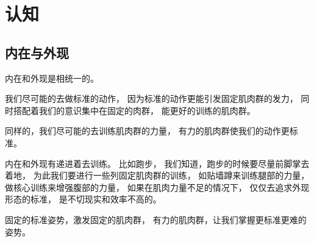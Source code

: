 
\chapter{认知}

\section{内在与外现}

内在和外现是相统一的。

我们尽可能的去做标准的动作，
因为标准的动作更能引发固定肌肉群的发力，
同时搭配着我们的意识集中在固定的肉群，
能更好的训练的肌肉群。

同样的，我们尽可能的去训练肌肉群的力量，
有力的肌肉群使我们的动作更标准。

内在和外现有递进着去训练。
比如跑步，
我们知道，跑步的时候要尽量前脚掌去着地，
为此我们要进行一些列固定肌肉群的训练，
如贴墙蹲来训练腿部的力量，
做核心训练来增强腹部的力量，
如果在肌肉力量不足的情况下，
仅仅去追求外现形态的标准，
是不切现实和效率不高的。

固定的标准姿势，激发固定的肌肉群，
有力的肌肉群，让我们掌握更标准更难的姿势。